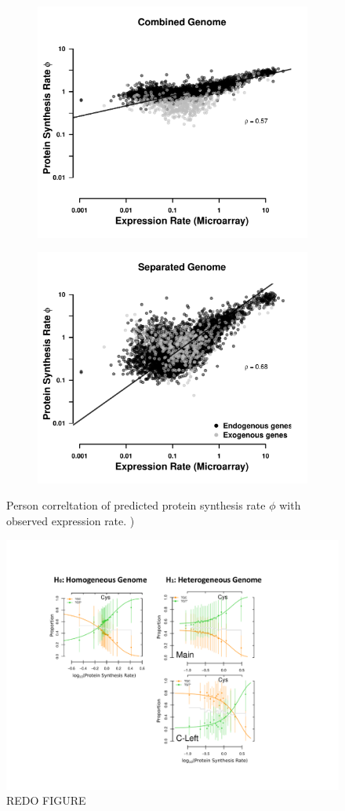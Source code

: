 \documentclass[12pt]{article}
\begin{document}
\begin{figure}[H]
    \centering
    \begin{subfigure}
        \centering
        \includegraphics[width=.45\textwidth]{img/phi_corr_plot_whole_Genome_estim.pdf}
    \end{subfigure}
    \begin{subfigure}
        \centering
        \includegraphics[width=.45\textwidth]{img/phi_corr_plot_split_Genome_estim.pdf}
    \end{subfigure}
    \caption{Person correltation of predicted protein synthesis rate $\phi$ with observed expression rate. )}
    \label{fig:phi_corr_two_cond}
\end{figure}

\begin{figure}[H]
     \centering
	\includegraphics[width=\textwidth]{img/cys_cub_pattern_comp.pdf}
	\caption{REDO FIGURE}
	\label{fig:cys_csp}
\end{figure}
	
\end{document}
